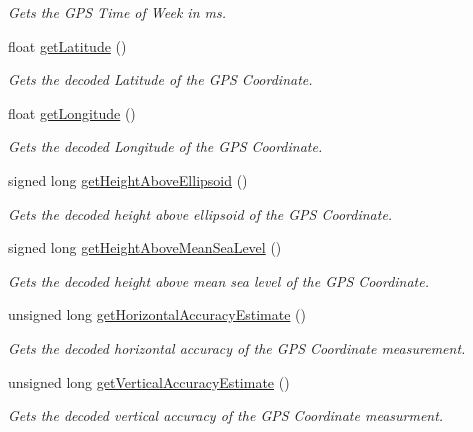 \begin{DoxyCompactItemize}
\begin{DoxyCompactList}\small\item\em Gets the G\+P\+S Time of Week in ms. \end{DoxyCompactList}\item 
float \hyperlink{classu_blox_ac39bf4a46447c1041647f58f44d49d55}{get\+Latitude} ()
\begin{DoxyCompactList}\small\item\em Gets the decoded Latitude of the G\+P\+S Coordinate. \end{DoxyCompactList}\item 
float \hyperlink{classu_blox_a197b674384c809289096235e5e8d1b86}{get\+Longitude} ()
\begin{DoxyCompactList}\small\item\em Gets the decoded Longitude of the G\+P\+S Coordinate. \end{DoxyCompactList}\item 
signed long \hyperlink{classu_blox_a4deda46fa93b47cc419309d1267bb9d9}{get\+Height\+Above\+Ellipsoid} ()
\begin{DoxyCompactList}\small\item\em Gets the decoded height above ellipsoid of the G\+P\+S Coordinate. \end{DoxyCompactList}\item 
signed long \hyperlink{classu_blox_a5e355dcb06d874794e5a236ae078cacc}{get\+Height\+Above\+Mean\+Sea\+Level} ()
\begin{DoxyCompactList}\small\item\em Gets the decoded height above mean sea level of the G\+P\+S Coordinate. \end{DoxyCompactList}\item 
unsigned long \hyperlink{classu_blox_a94c237054ac789f4b15d096ca774940e}{get\+Horizontal\+Accuracy\+Estimate} ()
\begin{DoxyCompactList}\small\item\em Gets the decoded horizontal accuracy of the G\+P\+S Coordinate measurement. \end{DoxyCompactList}\item 
unsigned long \hyperlink{classu_blox_a782209fd2fc0ebac5e601346c60d2a1d}{get\+Vertical\+Accuracy\+Estimate} ()
\begin{DoxyCompactList}\small\item\em Gets the decoded vertical accuracy of the G\+P\+S Coordinate measurment. \end{DoxyCompactList}\end{DoxyCompactItemize}


